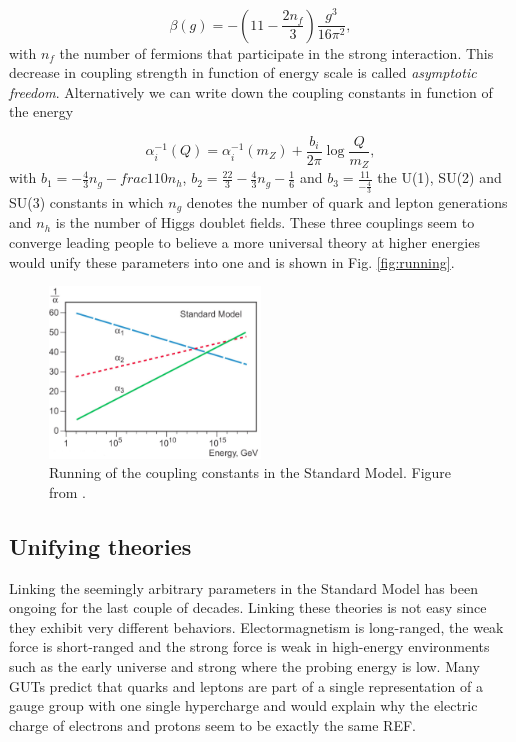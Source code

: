 \begin{equation}
\beta\left(g\right) = -\left(11 - \frac{2n_f}{3}\right)\frac{g^3}{16\pi^2},
\end{equation}
with $n_f$ the number of fermions that participate in the strong interaction. This decrease in coupling strength in function of energy scale is called \textit{asymptotic freedom}. Alternatively we can write down the coupling constants in function of the energy 

\begin{equation}
\alpha^{-1}_i \left(Q\right) = \alpha^{-1}_{i}\left(m_Z\right) + \frac{b_i}{2\pi}\log\frac{Q}{m_Z},
\end{equation}
with $b_1 = -\frac{4}{3}n_g - frac{1}{10}n_h$, $b_2 = \frac{22}{3}-\frac{4}{3}n_g-\frac{1}{6}$ and $b_3 = \frac{11}{-\frac{4}{3}}$ the U(1), SU(2) and
SU(3) constants in which $n_g$ denotes the  number of quark and lepton generations and $n_h$ is the number of Higgs doublet fields. These three couplings seem to converge leading people to believe a more universal theory at higher energies would unify these parameters into one and is shown in Fig. \ref{fig:running}.

\begin{figure}
\centering
\includegraphics[width = 0.5\textwidth]{chapter1/img/running}
\caption{Running of the coupling constants in the Standard Model. Figure from \cite{nobel2004url}.}
\end{figure}

\subsection{Unifying theories}
\label{sub:unifying}
Linking the seemingly arbitrary parameters in the Standard Model has been ongoing for the last couple of decades. Linking these theories is not easy since they exhibit very different behaviors. Electormagnetism is long-ranged, the weak force is short-ranged and the strong force is weak in high-energy environments such as the early universe and strong where the probing energy is low. Many GUTs predict that quarks and leptons are part of a single representation of a gauge group with one single hypercharge and would explain why the electric charge of electrons and protons seem to be exactly the same REF.

